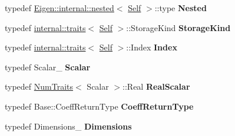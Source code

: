 \begin{DoxyCompactItemize}
typedef \hyperlink{struct_eigen_1_1internal_1_1nested}{Eigen\+::internal\+::nested}$<$ \hyperlink{class_eigen_1_1_tensor_fixed_size}{Self} $>$\+::type {\bfseries Nested}
\item 
\mbox{\label{class_eigen_1_1_tensor_fixed_size_abc19e8654428d0d1ef47591e716d1fa0}} 
typedef \hyperlink{struct_eigen_1_1internal_1_1traits}{internal\+::traits}$<$ \hyperlink{class_eigen_1_1_tensor_fixed_size}{Self} $>$\+::Storage\+Kind {\bfseries Storage\+Kind}
\item 
\mbox{\label{class_eigen_1_1_tensor_fixed_size_a9f216e56b705771c41b13318ab4f0d9f}} 
typedef \hyperlink{struct_eigen_1_1internal_1_1traits}{internal\+::traits}$<$ \hyperlink{class_eigen_1_1_tensor_fixed_size}{Self} $>$\+::Index {\bfseries Index}
\item 
\mbox{\label{class_eigen_1_1_tensor_fixed_size_a279e84dd200f45087fd11be7ef8868af}} 
typedef Scalar\+\_\+ {\bfseries Scalar}
\item 
\mbox{\label{class_eigen_1_1_tensor_fixed_size_ad8c3a607bc14a360d373abf69054614e}} 
typedef \hyperlink{group___core___module_struct_eigen_1_1_num_traits}{Num\+Traits}$<$ Scalar $>$\+::Real {\bfseries Real\+Scalar}
\item 
\mbox{\label{class_eigen_1_1_tensor_fixed_size_a6e1bc5f90cc4c5d7f5e3d3ad3d2d06bd}} 
typedef Base\+::\+Coeff\+Return\+Type {\bfseries Coeff\+Return\+Type}
\item 
\mbox{\label{class_eigen_1_1_tensor_fixed_size_aa307b323caf82bd8629923bcd4a7632b}} 
typedef Dimensions\+\_\+ {\bfseries Dimensions}
\end{DoxyCompactItemize}

